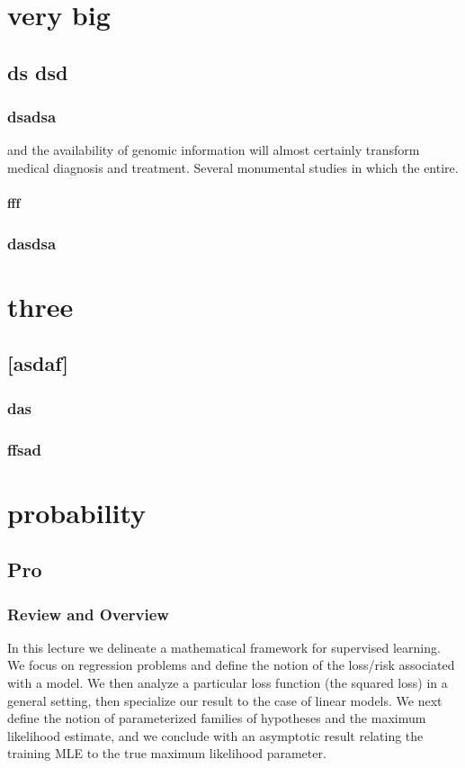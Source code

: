 \documentclass[]{subook}
\begin{document}
\part{very big}


\chapter{ds dsd}
\minitoc

\section{dsadsa}

\lipsum[1-6]
and the availability of genomic information will almost certainly transform medical diagnosis and treatment. Several monumental studies in which the entire\citep{LevelUpTheGuidetoGreatVideoGameDesign_Rogers}.
\subsection{fff}
\lipsum[2]
\section{dasdsa}
\lipsum[2-4]

\part{three}
\chapter{[asdaf]}
\section{das}
\lipsum[1-3]

\section{ffsad}
\lipsum[1-6]


\part{probability}

\chapter{Pro}
\newcommand{\cX}{\mathcal{X}}
\newcommand{\cY}{\mathcal{Y}}

\section{Review and Overview}
In this lecture we delineate a mathematical framework for supervised learning. We focus on regression problems and define the notion of the loss/risk associated with a model. We then analyze a particular loss function (the squared loss) in a general setting, then specialize our result to the case of linear models. We next define the notion of parameterized families of hypotheses and the maximum likelihood estimate, and we conclude with an asymptotic result relating the training MLE to the true maximum likelihood parameter.
\end{document}
